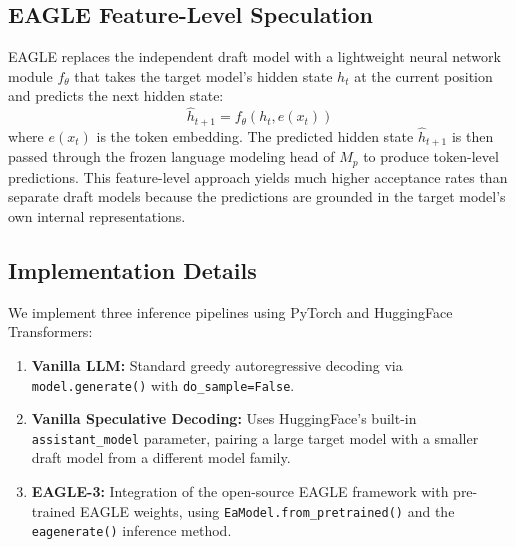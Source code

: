 \documentclass[11pt]{article}
\begin{document}
\subsection{EAGLE Feature-Level Speculation}

EAGLE \citep{li2024eagle} replaces the independent draft model with a lightweight neural network module $f_\theta$ that takes the target model's hidden state $h_t$ at the current position and predicts the next hidden state:
\begin{equation}
\hat{h}_{t+1} = f_\theta(h_t, e(x_t))
\label{eq:eagle}
\end{equation}
where $e(x_t)$ is the token embedding. The predicted hidden state $\hat{h}_{t+1}$ is then passed through the frozen language modeling head of $M_p$ to produce token-level predictions. This feature-level approach yields much higher acceptance rates than separate draft models because the predictions are grounded in the target model's own internal representations.

\subsection{Implementation Details}

We implement three inference pipelines using PyTorch and HuggingFace Transformers:
\begin{enumerate}
    \item \textbf{Vanilla LLM:} Standard greedy autoregressive decoding via \texttt{model.generate()} with \texttt{do\_sample=False}.
    \item \textbf{Vanilla Speculative Decoding:} Uses HuggingFace's built-in \texttt{assistant\_model} parameter, pairing a large target model with a smaller draft model from a different model family.
    \item \textbf{EAGLE-3:} Integration of the open-source EAGLE framework with pre-trained EAGLE weights, using \texttt{EaModel.from\_pretrained()} and the \texttt{eagenerate()} inference method.
\end{enumerate}
\end{document}
